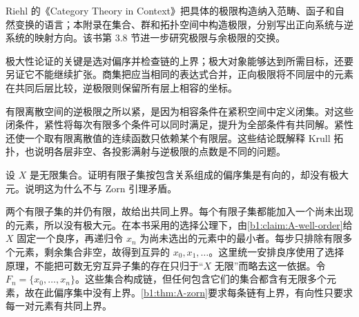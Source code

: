 \ProseParagraphBreak
Riehl 的《Category Theory in Context》\cite[Sections 3.1--3.2]{Riehl2016CategoryTheory}把具体的极限构造纳入范畴、函子和自然变换的语言；本附录在集合、群和拓扑空间中构造极限，分别写出正向系统与逆系统的映射方向。该书第 3.8 节\cite[Section 3.8]{Riehl2016CategoryTheory}进一步研究极限与余极限的交换。

%
%





\begin{chaptersummary}
	极大性论证的关键是选对偏序并检查链的上界；极大对象能够达到所需目标，还要另证它不能继续扩张。商集把应当相同的表达式合并，正向极限将不同层中的元素在共同后层比较，逆极限则保留所有层上相容的坐标。

	\ProseParagraphBreak
	有限离散空间的逆极限之所以紧，是因为相容条件在紧积空间中定义闭集。对这些闭条件，紧性将每次有限多个条件可以同时满足，提升为全部条件有共同解。紧性还使一个取有限离散值的连续函数只依赖某个有限层。这些结论既解释 Krull 拓扑，也说明各层非空、各投影满射与逆极限的点数是不同的问题。
\end{chaptersummary}

\BookExercises

\begin{exercise}\label{b1:ex:A-01}
	设 \(X\) 是无限集合。证明有限子集按包含关系组成的偏序集是有向的，却没有极大元。说明这为什么不与 Zorn 引理矛盾。
\end{exercise}

\begin{solution}
	两个有限子集的并仍有限，故给出共同上界。每个有限子集都能加入一个尚未出现的元素，所以没有极大元。在本书采用的选择公理下，由\cref{b1:claim:A-well-order}给 \(X\) 固定一个良序，再递归令 \(x_n\) 为尚未选出的元素中的最小者。每步只排除有限多个元素，剩余集合非空，故得到互异的 \(x_0,x_1,\ldots\)。这里统一安排良序使用了选择原理，不能把可数无穷互异子集的存在只归于“\(X\) 无限”而略去这一依据。令 \(F_n=\{x_0,\ldots,x_n\}\)。这些集合构成链，但任何包含它们的集合都含有无限多个元素，故在此偏序集中没有上界。\cref{b1:thm:A-zorn}要求每条链有上界，有向性只要求每一对元素有共同上界。
\end{solution}

